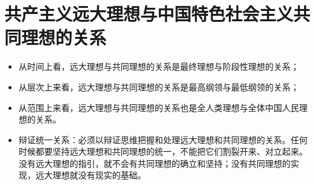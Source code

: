 \documentclass[12pt,openany]{ctexbook}
\begin{document}
\section{共产主义远大理想与中国特色社会主义共同理想的关系}
\begin{itemize}
  \item 从时间上看，远大理想与共同理想的关系是最终理想与阶段性理想的关系；
  \item 从层次上来看，远大理想与共同理想的关系是最高纲领与最低纲领的关系；
  \item 从范围上来看，远大理想与共同理想的关系也是全人类理想与全体中国人民理想的关系。
  \item 辩证统一关系：必须以辩证思维把握和处理远大理想和共同理想的关系。任何时候都要坚持远大理想和共同理想的统一，不能把它们割裂开来、对立起来。没有远大理想的指引，就不会有共同理想的确立和坚持；没有共同理想的实现，远大理想就没有现实的基础。
\end{itemize}
\end{document}
